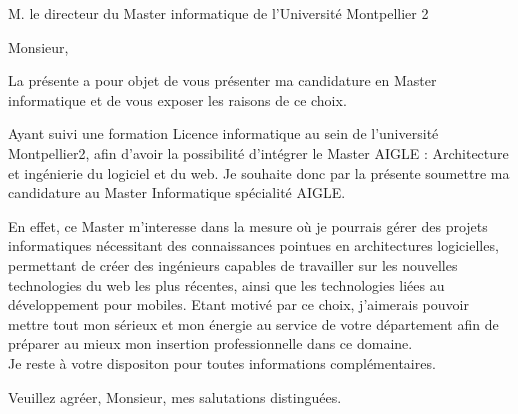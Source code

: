 \documentclass[12pt]{lettre}
\begin{document}
\begin{letter}{M. le directeur du Master informatique de l'Université
Montpellier 2}
\address{BORNAREL Matthieu\\18, rue des tilleuls\\34 090 Montpellier}
\nofax


\opening{Monsieur,}


La présente a pour objet de vous présenter ma candidature en Master
informatique et de vous exposer les raisons de ce choix.\


Ayant suivi une formation Licence informatique au sein de l'université Montpellier2, afin d’avoir la possibilité d’intégrer le Master AIGLE : Architecture et ingénierie du logiciel et du web. Je souhaite donc par la présente soumettre ma candidature au Master Informatique
spécialité AIGLE.\


En effet, ce Master m'interesse dans la mesure où je pourrais gérer des projets informatiques nécessitant des connaissances pointues en architectures logicielles, permettant de créer des ingénieurs capables de travailler sur les nouvelles
technologies du web les plus récentes, ainsi que les technologies liées au développement pour mobiles.
Etant motivé par ce choix, j’aimerais pouvoir mettre tout mon sérieux et mon énergie au service de votre département afin de préparer au mieux mon insertion professionnelle dans ce domaine. \\
Je reste à votre dispositon pour toutes informations complémentaires.


\closing{Veuillez agréer, Monsieur, mes salutations distinguées.}


\end{letter}
\end{document}
